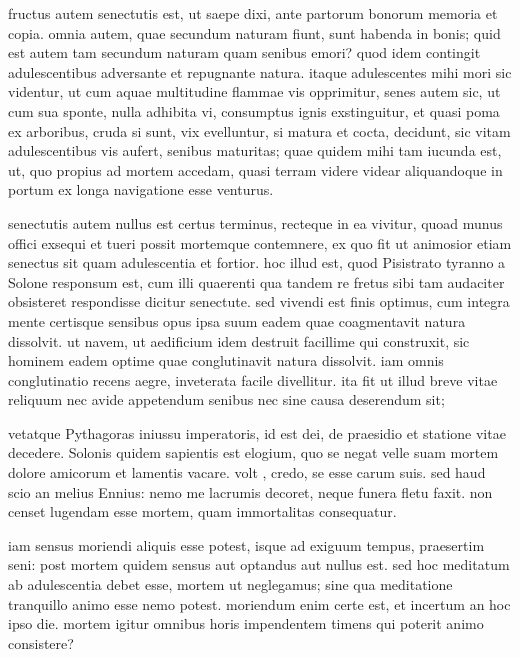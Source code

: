  fructus autem senectutis est, ut saepe dixi, ante partorum bonorum memoria et copia. omnia autem, quae secundum naturam fiunt, sunt habenda in bonis; quid est autem tam secundum naturam quam senibus emori? quod idem contingit adulescentibus adversante et repugnante natura. itaque adulescentes mihi mori sic videntur, ut cum aquae multitudine flammae vis opprimitur, senes autem sic, ut cum sua sponte, nulla adhibita vi, consumptus ignis exstinguitur, et quasi poma ex arboribus, cruda si sunt, vix evelluntur, si matura et cocta, decidunt, sic vitam adulescentibus vis aufert, senibus maturitas; quae quidem mihi tam iucunda est, ut, quo propius ad mortem accedam, quasi terram videre videar aliquandoque in portum ex longa navigatione esse venturus.

 senectutis autem nullus est certus terminus, recteque in ea vivitur, quoad munus offici exsequi et tueri possit mortemque contemnere, ex quo fit ut animosior etiam senectus sit quam adulescentia et fortior. hoc illud est, quod Pisistrato tyranno a Solone responsum est, cum illi quaerenti qua tandem re fretus sibi tam audaciter obsisteret respondisse dicitur senectute. sed vivendi est finis optimus, cum integra mente certisque sensibus opus ipsa suum eadem quae coagmentavit natura dissolvit. ut navem, ut aedificium idem destruit facillime qui construxit, sic hominem eadem optime quae conglutinavit natura dissolvit. iam omnis conglutinatio recens aegre, inveterata facile divellitur. ita fit ut illud breve vitae reliquum nec avide appetendum senibus nec sine causa deserendum sit;

 vetatque Pythagoras iniussu imperatoris, id est dei, de praesidio et statione vitae decedere. Solonis quidem sapientis est elogium, quo se negat velle suam mortem dolore amicorum et lamentis vacare. volt , credo, se esse carum suis. sed haud scio an melius Ennius: nemo me lacrumis decoret, neque funera fletu faxit. non censet lugendam esse mortem, quam immortalitas consequatur.

 iam sensus moriendi aliquis esse potest, isque ad exiguum tempus, praesertim seni: post mortem quidem sensus aut optandus aut nullus est. sed hoc meditatum ab adulescentia debet esse, mortem ut neglegamus; sine qua meditatione tranquillo animo esse nemo potest. moriendum enim certe est, et incertum an hoc ipso die. mortem igitur omnibus horis impendentem timens qui poterit animo consistere?

